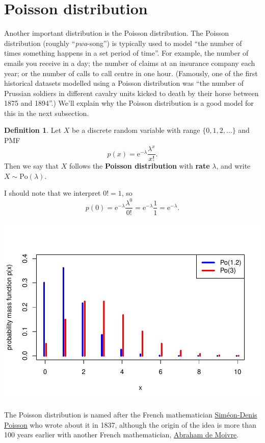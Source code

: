 \documentclass[
  a4paper,
]{book}
\theoremstyle{definition}
\newtheorem{definition}{Definition}[chapter]
\theoremstyle{definition}
\theoremstyle{definition}
\theoremstyle{definition}
\theoremstyle{remark}
\begin{document}
\hypertarget{poisson}{%
\section{Poisson distribution}\label{poisson}}

Another important distribution is the Poisson distribution. The Poisson distribution (roughly ``\emph{pwa}-song'') is typically used to model ``the number of times something happens in a set period of time''. For example, the number of emails you receive in a day; the number of claims at an insurance company each year; or the number of calls to call centre in one hour. (Famously, one of the first historical datasets modelled using a Poisson distribution was ``the number of Prussian soldiers in different cavalry units kicked to death by their horse between 1875 and 1894''.) We'll explain why the Poisson distribution is a good model for this in the next subsection.

\begin{definition}
Let \(X\) be a discrete random variable with range \(\{0,1,2,\dots\}\) and PMF
\[ p(x) = \mathrm e^{-\lambda}  \frac{\lambda^x}{x!} . \]
Then we say that \(X\) follows the \textbf{Poisson distribution} with \textbf{rate} \(\lambda\), and write \(X \sim \text{Po}(\lambda)\).
\end{definition}

I should note that we interpret \(0! = 1\), so
\[ p(0) = \mathrm e^{-\lambda}  \frac{\lambda^0}{0!} = \mathrm e^{-\lambda}  \frac{1}{1} = \mathrm e^{-\lambda} . \]

\includegraphics{math1710_files/figure-latex/po-pic-1.pdf}

The Poisson distribution is named after the French mathematician \href{https://mathshistory.st-andrews.ac.uk/Biographies/Poisson/}{Siméon-Denis Poisson} who wrote about it in 1837, although the origin of the idea is more than 100 years earlier with another French mathematician, \href{https://mathshistory.st-andrews.ac.uk/Biographies/De_Moivre/}{Abraham de Moivre}.
\end{document}
